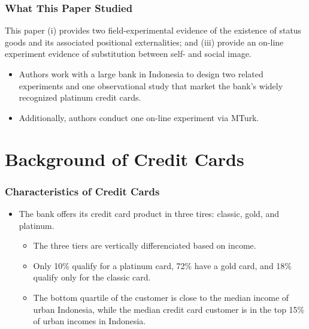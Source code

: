 \documentclass[unicode,12pt]{beamer}
\begin{document}
    \begin{frame}
        \frametitle{What This Paper Studied}
    
        This paper (i) provides two field-experimental evidence of the existence of status goods and its associated positional externalities; and (iii) provide an on-line experiment evidence of substitution between self- and social image.
        \begin{itemize}
            \item Authors work with a large bank in Indonesia to design two related experiments and one observational study that market the bank's widely recognized platinum credit cards.
            \item Additionally, authors conduct one on-line experiment via MTurk.
        \end{itemize}
    
    \end{frame}

    \section{Background of Credit Cards}

    \begin{frame}
        \frametitle{Characteristics of Credit Cards}
    
        \begin{itemize}
            \item The bank offers its credit card product in three tires: classic, gold, and platinum.
            \begin{itemize}
                \item The three tiers are vertically differenciated based on income.
                \item Only 10\% qualify for a platinum card, 72\% have a gold card, and 18\% qualify only for the classic card.
                \item The bottom quartile of the customer is close to the median income of urban Indonesia, while the median credit card customer is in the top 15\% of urban incomes in Indonesia.
            \end{itemize}
        \end{itemize}
    
    \end{frame}
\end{document}
